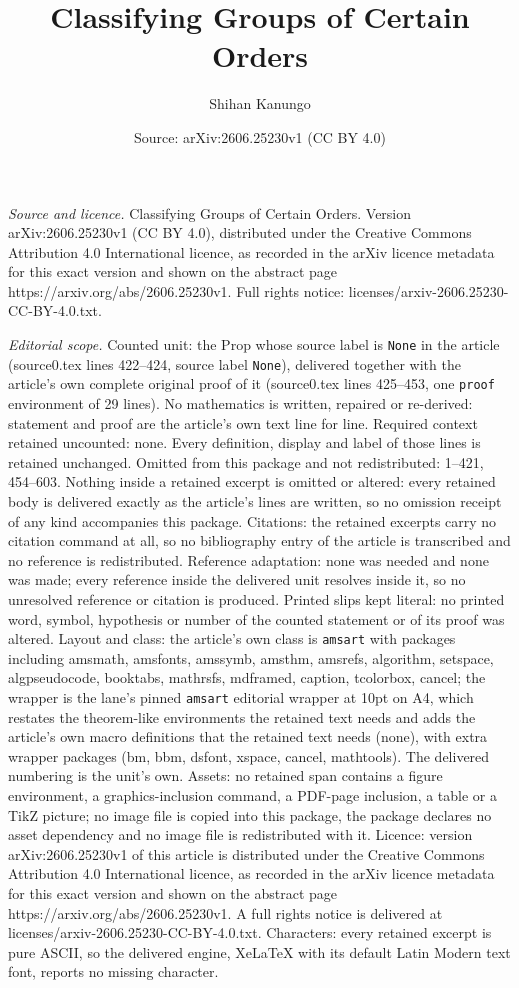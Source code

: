 \documentclass[10pt,a4paper]{amsart}
\title[Classifying Groups of Certain Orders]{Classifying Groups of Certain Orders}
\author{Shihan Kanungo}
\date{Source: arXiv:2606.25230v1 (CC BY 4.0)}
\begin{document}
\maketitle

\noindent\emph{Source and licence.} Classifying Groups of Certain Orders. Version arXiv:2606.25230v1 (CC BY 4.0), distributed under the Creative Commons Attribution 4.0 International licence, as recorded in the arXiv licence metadata for this exact version and shown on the abstract page https://arxiv.org/abs/2606.25230v1. Full rights notice: licenses/arxiv-2606.25230-CC-BY-4.0.txt.\par\smallskip

\noindent\textit{Editorial scope.} Counted unit: the Prop whose source label is \texttt{None} in the article (source0.tex lines 422--424, source label \texttt{None}), delivered together with the article's own complete original proof of it (source0.tex lines 425--453, one \texttt{proof} environment of 29 lines). No mathematics is written, repaired or re-derived: statement and proof are the article's own text line for line. Required context retained uncounted: none. Every definition, display and label of those lines is retained unchanged. Omitted from this package and not redistributed: 1--421, 454--603. Nothing inside a retained excerpt is omitted or altered: every retained body is delivered exactly as the article's lines are written, so no omission receipt of any kind accompanies this package. Citations: the retained excerpts carry no citation command at all, so no bibliography entry of the article is transcribed and no reference is redistributed. Reference adaptation: none was needed and none was made; every reference inside the delivered unit resolves inside it, so no unresolved reference or citation is produced. Printed slips kept literal: no printed word, symbol, hypothesis or number of the counted statement or of its proof was altered. Layout and class: the article's own class is \texttt{amsart} with packages including amsmath, amsfonts, amssymb, amsthm, amsrefs, algorithm, setspace, algpseudocode, booktabs, mathrsfs, mdframed, caption, tcolorbox, cancel; the wrapper is the lane's pinned \texttt{amsart} editorial wrapper at 10pt on A4, which restates the theorem-like environments the retained text needs and adds the article's own macro definitions that the retained text needs (none), with extra wrapper packages (bm, bbm, dsfont, xspace, cancel, mathtools). The delivered numbering is the unit's own. Assets: no retained span contains a figure environment, a graphics-inclusion command, a PDF-page inclusion, a table or a TikZ picture; no image file is copied into this package, the package declares no asset dependency and no image file is redistributed with it. Licence: version arXiv:2606.25230v1 of this article is distributed under the Creative Commons Attribution 4.0 International licence, as recorded in the arXiv licence metadata for this exact version and shown on the abstract page https://arxiv.org/abs/2606.25230v1. A full rights notice is delivered at licenses/arxiv-2606.25230-CC-BY-4.0.txt. Characters: every retained excerpt is pure ASCII, so the delivered engine, XeLaTeX with its default Latin Modern text font, reports no missing character.
\end{document}

